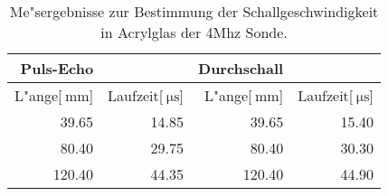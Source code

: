 
\begin{table}[!h]
\begin{center}
\begin{tabular}{|r|r|r|r|}
\hline
Puls-Echo & & Durchschall &\\
\hline
 L"ange[$\SI{}{\milli\meter}$] & Laufzeit[$\SI{}{\micro\second}$] & L"ange[$\SI{}{\milli\meter}$] & Laufzeit[$\SI{}{\micro\second}$]\\
\hline
\hline
 39.65 &	14.85 &	 39.65 &	15.40\\
 80.40 &	29.75 &	 80.40 &	30.30\\
120.40 &	44.35 &	120.40 &	44.90\\
\hline
\end{tabular}
\caption[]{Me"sergebnisse zur Bestimmung der Schallgeschwindigkeit in Acrylglas der 4Mhz Sonde.}
\label{a4}
\end{center}
\end{table}